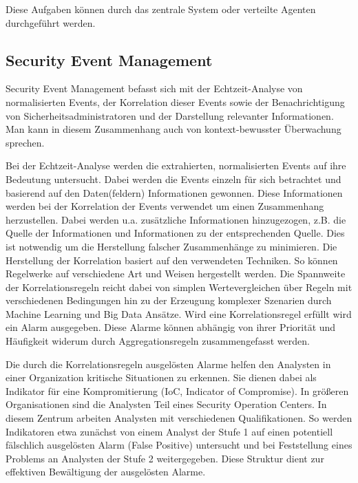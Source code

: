 Diese Aufgaben können durch das zentrale System oder verteilte Agenten durchgeführt werden. 

\subsection{Security Event Management}
\label{cha:Security Event Management}

Security Event Management befasst sich mit der Echtzeit-Analyse von normalisierten Events, der Korrelation dieser Events sowie der Benachrichtigung von Sicherheitsadministratoren und der Darstellung relevanter Informationen. Man kann in diesem Zusammenhang auch von kontext-bewusster Überwachung sprechen. %

Bei der Echtzeit-Analyse werden die extrahierten, normalisierten Events auf ihre Bedeutung untersucht. Dabei werden die Events einzeln für sich betrachtet und basierend auf den Daten(feldern) Informationen gewonnen. Diese Informationen werden bei der Korrelation der Events verwendet um einen Zusammenhang herzustellen. Dabei werden u.a. zusätzliche Informationen hinzugezogen, z.B. die Quelle der Informationen und Informationen zu der entsprechenden Quelle.
Dies ist notwendig um die Herstellung falscher Zusammenhänge zu minimieren. Die Herstellung der Korrelation basiert auf den verwendeten Techniken. So können Regelwerke auf verschiedene Art und Weisen hergestellt werden. Die Spannweite der Korrelationsregeln reicht dabei von simplen Wertevergleichen über Regeln mit verschiedenen Bedingungen hin zu der Erzeugung komplexer Szenarien durch Machine Learning und Big Data Ansätze. Wird eine Korrelationsregel erfüllt wird ein Alarm ausgegeben. Diese Alarme können abhängig von ihrer Priorität und Häufigkeit widerum durch Aggregationsregeln zusammengefasst werden.

Die durch die Korrelationsregeln ausgelösten Alarme helfen den Analysten in einer Organization kritische Situationen zu erkennen. Sie dienen dabei als Indikator für eine Kompromitierung (IoC, Indicator of Compromise). In größeren Organisationen sind die Analysten Teil eines \glqq Security Operation Centers\grqq  . In diesem Zentrum arbeiten Analysten mit verschiedenen Qualifikationen. So werden Indikatoren etwa zunächst von einem Analyst der Stufe 1 auf einen potentiell fälschlich ausgelösten Alarm (False Positive) untersucht und bei Feststellung eines Problems an Analysten der Stufe 2 weitergegeben. Diese Struktur dient zur effektiven Bewältigung der ausgelösten Alarme.


